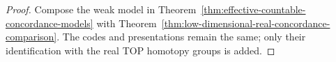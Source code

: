 \begin{proof}
Compose the weak model in
Theorem~\ref{thm:effective-countable-concordance-models} with
Theorem~\ref{thm:low-dimensional-real-concordance-comparison}.
The codes and presentations remain the same; only their
identification with the real TOP homotopy groups is added.
\end{proof}
